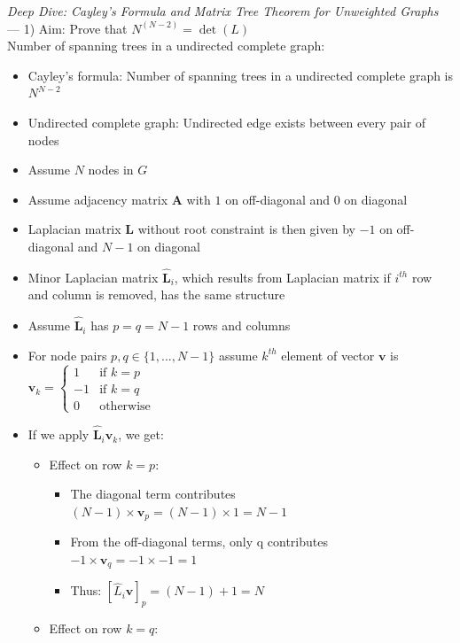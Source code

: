 \emph{Deep Dive: Cayley's Formula and Matrix Tree Theorem for Unweighted Graphs} ---
1) Aim: Prove that $N^{(N-2)} = \det({L})$\\
Number of spanning trees in a undirected complete graph:
\begin{itemize}
    \item Cayley's formula: Number of spanning trees in a undirected complete graph is $N^{N-2}$
    \item Undirected complete graph: Undirected edge exists between every pair of nodes
    \item Assume $N$ nodes in $G$
    \item Assume adjacency matrix $\boldsymbol{A}$ with $1$ on off-diagonal and $0$ on diagonal
    \item Laplacian matrix $\boldsymbol{L}$ without root constraint is then given by $-1$ on off-diagonal and $N-1$ on diagonal
    \item Minor Laplacian matrix $\hat{\boldsymbol{L}}_i$, which results from Laplacian matrix if $i^{th}$ row and column is removed, has the same structure
    \item Assume $\hat{\boldsymbol{L}}_i$ has $p = q = N-1$ rows and columns
    \item For node pairs $p, q \in \{1, ..., N-1\}$ assume $k^{th}$ element of vector $\boldsymbol{v}$ is $\boldsymbol{v}_k = \begin{cases}
    1 & \text{if } k = p \\
    -1 & \text{if } k = q \\
    0 & \text{otherwise}
    \end{cases}$
    \item If we apply $\hat{\boldsymbol{L}}_i \boldsymbol{v}_k$, we get:
    \begin{itemize}
        \item Effect on row $k = p$:
        \begin{itemize}
            \item The diagonal term contributes $(N-1) \times \boldsymbol{v}_p = (N-1) \times 1 = N-1$
            \item From the off-diagonal terms, only q contributes $-1 \times \boldsymbol{v}_q = -1 \times -1 = 1$
            \item Thus:
            $
            [\hat{L}_i \boldsymbol{v}]_p = (N-1) + 1 = N
            $
        \end{itemize}   
        \item Effect on row $k = q$:
        \begin{itemize}

\end{itemize}
\end{itemize}
\end{itemize}
